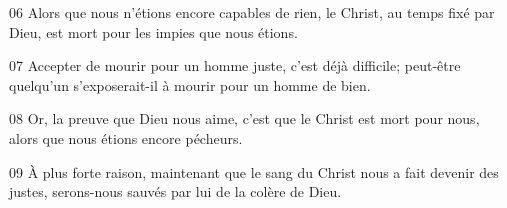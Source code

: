 
06 Alors que nous n’étions encore capables de rien, le Christ, au temps fixé par Dieu, est mort pour les impies que nous étions.

07 Accepter de mourir pour un homme juste, c’est déjà difficile; peut-être quelqu’un s’exposerait-il à mourir pour un homme de bien.

08 Or, la preuve que Dieu nous aime, c’est que le Christ est mort pour nous, alors que nous étions encore pécheurs.

09 À plus forte raison, maintenant que le sang du Christ nous a fait devenir des justes, serons-nous sauvés par lui de la colère de Dieu.
